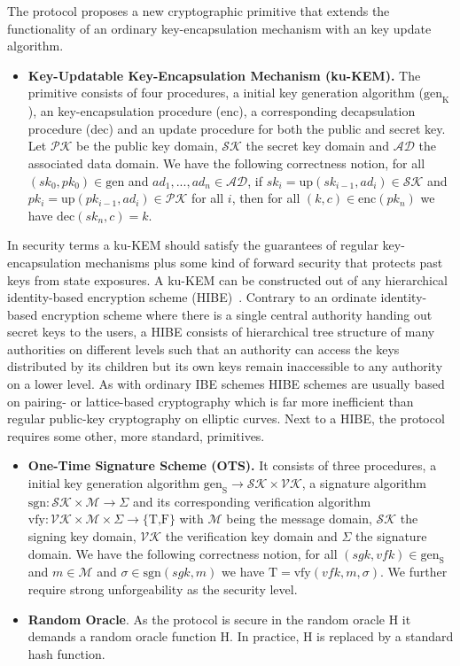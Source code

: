 \documentclass[11pt,a4paper,twoside,openright,bibliography=totoc]{scrbook}
\renewcommand{\t}{\text} %
\begin{document}
The protocol proposes a new cryptographic primitive that extends the
functionality of an ordinary key-encapsulation mechanism with an
key update algorithm.
\begin{itemize}
\item \textbf{Key-Updatable Key-Encapsulation Mechanism (ku-KEM).} The primitive
  consists of four procedures, a initial key generation algorithm ($\t{gen}_\t{K}$), an
  key-encapsulation procedure (enc), a corresponding decapsulation procedure (dec) and
  an update procedure for both the public and secret key. Let $\mathcal{PK}$ be
  the public key domain, $\mathcal{SK}$ the secret key domain and $\mathcal{AD}$ the
  associated data domain. We have the following correctness notion, for all
  $(sk_0, pk_0) \in \t{gen}$ and $ad_1,...,ad_n \in \mathcal{AD}$, if
  $sk_i = \t{up}(sk_{i-1},ad_i) \in \mathcal{SK}$ and
  $pk_i = \t{up}(pk_{i-1},ad_i) \in \mathcal{PK}$ for all $i$, then for all
  $(k,c) \in \t{enc}(pk_n)$ we have $\t{dec}(sk_n,c)=k$.
\end{itemize}
In security terms a ku-KEM should satisfy the guarantees of regular
key-encapsulation mechanisms plus some kind of forward security that
protects past keys from state exposures. A ku-KEM can be constructed
out of any hierarchical identity-based encryption scheme
(HIBE)~\cite{gentry2002hierarchical}. Contrary to an ordinate
identity-based encryption scheme where there is a single central
authority handing out secret keys to the users, a HIBE consists
of hierarchical tree structure of many authorities on different levels
such that an authority can access the keys distributed by its children
but its own keys remain inaccessible to any authority on a lower level.
As with ordinary IBE schemes HIBE schemes are usually based on pairing- or
lattice-based cryptography which is far more inefficient than
regular public-key cryptography on elliptic curves.
Next to a HIBE, the protocol requires some other, more standard, primitives.
\begin{itemize}
\item \textbf{One-Time Signature Scheme (OTS).} It consists of three procedures, a initial
  key generation algorithm $\t{gen}_\t{S} \rightarrow \mathcal{SK} \times \mathcal{VK}$,
  a signature algorithm $\t{sgn}: \mathcal{SK} \times \mathcal{M} \rightarrow \Sigma$
  and its corresponding verification algorithm
  $\t{vfy}: \mathcal{VK} \times \mathcal{M} \times \Sigma \rightarrow \{\t{T,F}\}$ with
  $\mathcal{M}$ being the message domain,
  $\mathcal{SK}$ the signing key domain, $\mathcal{VK}$ the verification key domain and
  $\Sigma$ the signature domain.
  We have the following correctness notion, for all $(sgk,vfk) \in \t{gen}_\t{S}$ and
  $m \in \mathcal{M}$ and $\sigma \in \t{sgn}(sgk,m)$ we have $\t{T} = \t{vfy}(vfk,m,\sigma)$.
  We further require strong unforgeability as the security level.
\item \textbf{Random Oracle}. As the protocol is secure in the random oracle H it demands
  a random oracle function H. In practice, H is replaced by a standard hash function.
\end{itemize}
\end{document}
